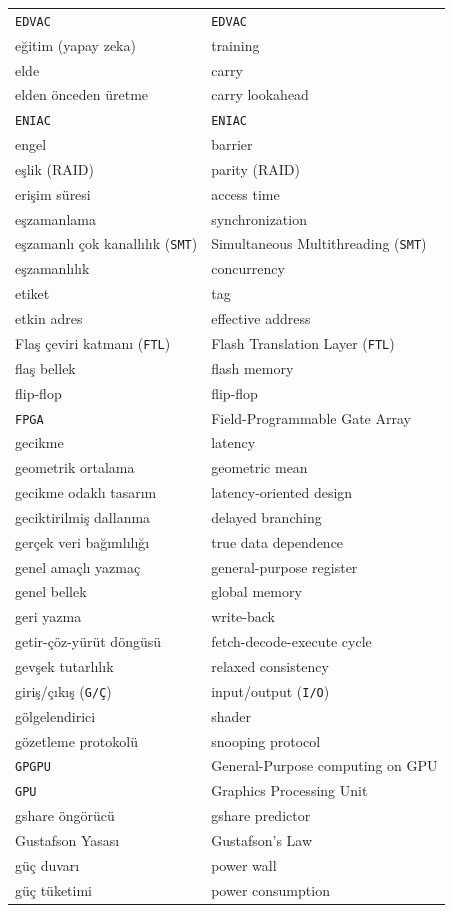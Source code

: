 {\begin{longtable}{@{}p{7.6cm}p{7.6cm}@{}}
\texttt{EDVAC} & \texttt{EDVAC} \\
eğitim (yapay zeka) & training \\
elde & carry \\
elden önceden üretme & carry lookahead \\
\texttt{ENIAC} & \texttt{ENIAC} \\
engel & barrier \\
eşlik (RAID) & parity (RAID) \\
erişim süresi & access time \\
eşzamanlama & synchronization \\
eşzamanlı çok kanallılık (\texttt{SMT}) & Simultaneous Multithreading (\texttt{SMT}) \\
eşzamanlılık & concurrency \\
etiket & tag \\
etkin adres & effective address \\

Flaş çeviri katmanı (\texttt{FTL}) & Flash Translation Layer (\texttt{FTL}) \\
flaş bellek & flash memory \\
flip-flop & flip-flop \\
\texttt{FPGA} & Field-Programmable Gate Array \\

gecikme & latency \\
geometrik ortalama & geometric mean \\
gecikme odaklı tasarım & latency-oriented design \\
geciktirilmiş dallanma & delayed branching \\
gerçek veri bağımlılığı & true data dependence \\
genel amaçlı yazmaç & general-purpose register \\
genel bellek & global memory \\
geri yazma & write-back \\
getir-çöz-yürüt döngüsü & fetch-decode-execute cycle \\
gevşek tutarlılık & relaxed consistency \\
giriş/çıkış (\texttt{G/Ç}) & input/output (\texttt{I/O}) \\
gölgelendirici & shader \\
gözetleme protokolü & snooping protocol \\
\texttt{GPGPU} & General-Purpose computing on GPU \\
\texttt{GPU} & Graphics Processing Unit \\
gshare öngörücü & gshare predictor \\
Gustafson Yasası & Gustafson's Law \\
güç duvarı & power wall \\
güç tüketimi & power consumption \\


\end{longtable}}
